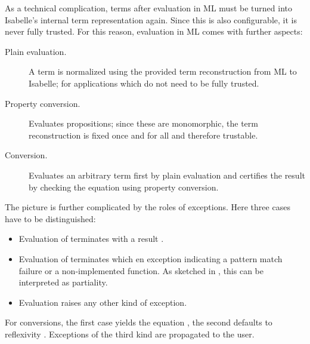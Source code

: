 \begin{isabellebody}
\begin{isamarkuptext}
  As a technical complication, terms after evaluation in ML must be
  turned into Isabelle's internal term representation again.  Since
  this is also configurable, it is never fully trusted.  For this
  reason, evaluation in ML comes with further aspects:

  \begin{description}

    \item[Plain evaluation.]  A term is normalized using the provided
      term reconstruction from ML to Isabelle; for applications which
      do not need to be fully trusted.

    \item[Property conversion.]  Evaluates propositions; since these
      are monomorphic, the term reconstruction is fixed once and for all
      and therefore trustable.

    \item[Conversion.]  Evaluates an arbitrary term  first
      by plain evaluation and certifies the result  by
      checking the equation  using property
      conversion.

  \end{description}

  \noindent The picture is further complicated by the roles of
  exceptions.  Here three cases have to be distinguished:

  \begin{itemize}

    \item Evaluation of  terminates with a result .

    \item Evaluation of  terminates which en exception
      indicating a pattern match failure or a non-implemented
      function.  As sketched in , this can be
      interpreted as partiality.
     
    \item Evaluation raises any other kind of exception.
     
  \end{itemize}

  \noindent For conversions, the first case yields the equation , the second defaults to reflexivity .
  Exceptions of the third kind are propagated to the user.


\end{isamarkuptext}
\end{isabellebody}
